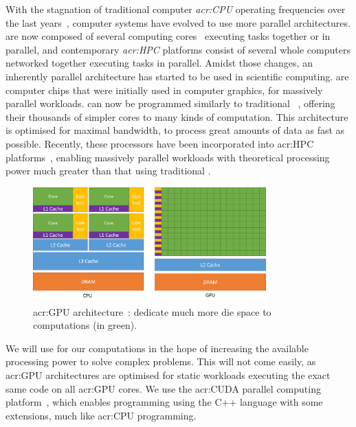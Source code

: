 With the stagnation of traditional computer \textit{\acrfull{acr:CPU}} operating frequencies over
the last years~\cite{Parkhurst2006}, computer systems have evolved to use more parallel
architectures.  are now composed of several computing cores~\cite{Nayfeh1997}
executing tasks together or in parallel, and contemporary \textit{\acrfull{acr:HPC}} platforms
consist of several whole computers networked together executing tasks in parallel. Amidst those
changes, an inherently parallel architecture has started to be used in scientific computing.
\textit{} are computer chips that were initially used in computer graphics, for
massively parallel workloads.  can now be programmed similarly to traditional
~\cite{Owens2008}, offering their thousands of simpler cores to many kinds of
computation. This architecture is optimised for maximal bandwidth, to process great amounts of data
as fast as possible. Recently, these processors have been incorporated into \acrshort{acr:HPC}
platforms~\cite{Fan2004}, enabling massively parallel workloads with theoretical processing power
much greater than that using traditional .

\begin{figure}[H]
	\centering
	\includegraphics[width=0.8\textwidth]{Chapter_introduction/media/gpu-devotes-more-transistors-to-data-processing}
	\caption{\Acrshort{acr:GPU} architecture~\cite{Nvidia2021}:  dedicate much more die space to computations (in green).}\label{fig:intro_gpu}
\end{figure}

We will use  for our computations in the hope of increasing the available
processing power to solve complex problems. This will not come easily, as \acrshort{acr:GPU}
architectures are optimised for static workloads executing the exact same code on all
\acrshort{acr:GPU} cores. We use the \acrshort{acr:CUDA} parallel computing
platform~\cite{Garland2008}, which enables programming  using the C++ language
with some extensions, much like \acrshort{acr:CPU} programming.


